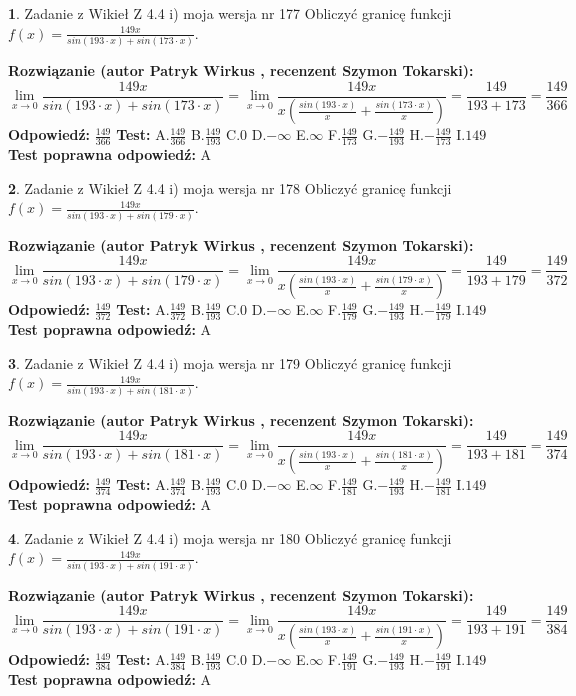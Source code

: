 \documentclass[12pt, a4paper]{article}
\theoremstyle{definition} %
\newtheorem{zad}{}
\newcommand{\zadStart}[1]{\begin{zad}#1\newline}
\newcommand{\zadStop}{\end{zad}}
\newcommand{\rozwStart}[2]{\noindent \textbf{Rozwiązanie (autor #1 , recenzent #2): }\newline}
\newcommand{\rozwStop}{\newline}
\newcommand{\odpStart}{\noindent \textbf{Odpowiedź:}\newline}
\newcommand{\odpStop}{\newline}
\newcommand{\testStart}{\noindent \textbf{Test:}\newline}
\newcommand{\testStop}{\newline}
\newcommand{\kluczStart}{\noindent \textbf{Test poprawna odpowiedź:}\newline}
\newcommand{\kluczStop}{\newline}
\begin{document}
\zadStart{Zadanie z Wikieł Z 4.4 i) moja wersja nr 177}
Obliczyć granicę funkcji $f(x)=\frac{149x}{sin(193\cdot x) +sin(173\cdot x)}$.
\zadStop
\rozwStart{Patryk Wirkus}{Szymon Tokarski}
$$\lim\limits_{x\to 0}\frac{149x}{sin(193\cdot x) +sin(173\cdot x)}=\lim\limits_{x\to 0}\frac{149x}{x(\frac{sin(193\cdot x)}{x}+\frac{sin(173\cdot x)}{x})}=\frac{149}{193+173} = \frac{149}{366}$$
\rozwStop
\odpStart
$\frac{149}{366}$
\odpStop
\testStart
A.$\frac{149}{366}$
B.$\frac{149}{193}$
C.$0$
D.$-\infty$
E.$\infty$
F.$\frac{149}{173}$
G.$-\frac{149}{193}$
H.$-\frac{149}{173}$
I.$149$
\testStop
\kluczStart
A
\kluczStop



\zadStart{Zadanie z Wikieł Z 4.4 i) moja wersja nr 178}
Obliczyć granicę funkcji $f(x)=\frac{149x}{sin(193\cdot x) +sin(179\cdot x)}$.
\zadStop
\rozwStart{Patryk Wirkus}{Szymon Tokarski}
$$\lim\limits_{x\to 0}\frac{149x}{sin(193\cdot x) +sin(179\cdot x)}=\lim\limits_{x\to 0}\frac{149x}{x(\frac{sin(193\cdot x)}{x}+\frac{sin(179\cdot x)}{x})}=\frac{149}{193+179} = \frac{149}{372}$$
\rozwStop
\odpStart
$\frac{149}{372}$
\odpStop
\testStart
A.$\frac{149}{372}$
B.$\frac{149}{193}$
C.$0$
D.$-\infty$
E.$\infty$
F.$\frac{149}{179}$
G.$-\frac{149}{193}$
H.$-\frac{149}{179}$
I.$149$
\testStop
\kluczStart
A
\kluczStop



\zadStart{Zadanie z Wikieł Z 4.4 i) moja wersja nr 179}
Obliczyć granicę funkcji $f(x)=\frac{149x}{sin(193\cdot x) +sin(181\cdot x)}$.
\zadStop
\rozwStart{Patryk Wirkus}{Szymon Tokarski}
$$\lim\limits_{x\to 0}\frac{149x}{sin(193\cdot x) +sin(181\cdot x)}=\lim\limits_{x\to 0}\frac{149x}{x(\frac{sin(193\cdot x)}{x}+\frac{sin(181\cdot x)}{x})}=\frac{149}{193+181} = \frac{149}{374}$$
\rozwStop
\odpStart
$\frac{149}{374}$
\odpStop
\testStart
A.$\frac{149}{374}$
B.$\frac{149}{193}$
C.$0$
D.$-\infty$
E.$\infty$
F.$\frac{149}{181}$
G.$-\frac{149}{193}$
H.$-\frac{149}{181}$
I.$149$
\testStop
\kluczStart
A
\kluczStop



\zadStart{Zadanie z Wikieł Z 4.4 i) moja wersja nr 180}
Obliczyć granicę funkcji $f(x)=\frac{149x}{sin(193\cdot x) +sin(191\cdot x)}$.
\zadStop
\rozwStart{Patryk Wirkus}{Szymon Tokarski}
$$\lim\limits_{x\to 0}\frac{149x}{sin(193\cdot x) +sin(191\cdot x)}=\lim\limits_{x\to 0}\frac{149x}{x(\frac{sin(193\cdot x)}{x}+\frac{sin(191\cdot x)}{x})}=\frac{149}{193+191} = \frac{149}{384}$$
\rozwStop
\odpStart
$\frac{149}{384}$
\odpStop
\testStart
A.$\frac{149}{384}$
B.$\frac{149}{193}$
C.$0$
D.$-\infty$
E.$\infty$
F.$\frac{149}{191}$
G.$-\frac{149}{193}$
H.$-\frac{149}{191}$
I.$149$
\testStop
\kluczStart
A
\kluczStop
\end{document}
